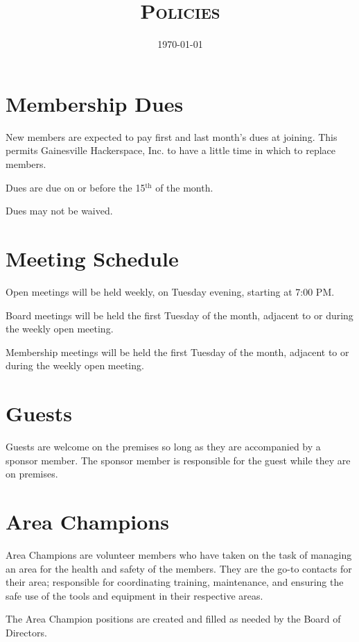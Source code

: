 \documentclass[10pt,letterpaper,titlepage]{article}
\title{%
    \textsc{\LARGE \corpname \\
    \Large Policies
    }
}
\date{\today}
\author{}
\newcommand\corpname{Gainesville Hackerspace, Inc.}
\newcommand{\superscript}[1]{\ensuremath{^{\textrm{#1}}}}
\renewcommand{\th}[0]{\superscript{th}}
\begin{document}
\maketitle

\tableofcontents
\newpage

\section{Membership Dues}
\label{dues}

New members are expected to pay first and last month's dues at joining. This
permits \corpname{} to have a little time in which to replace members.

Dues are due on or before the 15\th{} of the month.

Dues may not be waived.

\section{Meeting Schedule}

Open meetings will be held weekly, on Tuesday evening, starting at 7:00 PM.

Board meetings will be held the first Tuesday of the month, adjacent
to or during the weekly open meeting.

Membership meetings will be held the first Tuesday of the month,
adjacent to or during the weekly open meeting.

\section{Guests}
Guests are welcome on the premises so long as they are accompanied by a sponsor
member. The sponsor member is responsible for the guest while they are on
premises.

\section{Area Champions}
Area Champions are volunteer members who have taken on the task of managing an
area for the health and safety of the members. They are the go-to contacts for
their area; responsible for coordinating training, maintenance, and ensuring
the safe use of the tools and equipment in their respective areas.

The Area Champion positions are created and filled as needed by the Board of
Directors.
\end{document}
